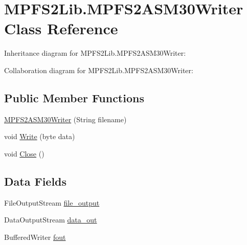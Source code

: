 \hypertarget{class_microchip_m_p_f_s_1_1_m_p_f_s2_lib_1_1_m_p_f_s2_a_s_m30_writer}{}\section{M\+P\+F\+S2\+Lib.\+M\+P\+F\+S2\+A\+S\+M30\+Writer Class Reference}
\label{class_microchip_m_p_f_s_1_1_m_p_f_s2_lib_1_1_m_p_f_s2_a_s_m30_writer}


Inheritance diagram for M\+P\+F\+S2\+Lib.\+M\+P\+F\+S2\+A\+S\+M30\+Writer\+:


Collaboration diagram for M\+P\+F\+S2\+Lib.\+M\+P\+F\+S2\+A\+S\+M30\+Writer\+:
\subsection*{Public Member Functions}
\begin{DoxyCompactItemize}
\item 
\hyperlink{class_microchip_m_p_f_s_1_1_m_p_f_s2_lib_1_1_m_p_f_s2_a_s_m30_writer_a801d66c9da87bcf8d7eb0ed6b02407fa}{M\+P\+F\+S2\+A\+S\+M30\+Writer} (String filename)
\item 
void \hyperlink{class_microchip_m_p_f_s_1_1_m_p_f_s2_lib_1_1_m_p_f_s2_a_s_m30_writer_a9b9d2585120ffb9ce8a6e4f644ee9df7}{Write} (byte data)
\item 
void \hyperlink{class_microchip_m_p_f_s_1_1_m_p_f_s2_lib_1_1_m_p_f_s2_a_s_m30_writer_a7f7a3199c392465d0767c6506c1af5b4}{Close} ()
\end{DoxyCompactItemize}
\subsection*{Data Fields}
\begin{DoxyCompactItemize}
\item 
File\+Output\+Stream \hyperlink{class_microchip_m_p_f_s_1_1_m_p_f_s2_lib_1_1_m_p_f_s2_a_s_m30_writer_ab03cefa914341b065e79a003ebc36ba5}{file\+\_\+output}
\item 
Data\+Output\+Stream \hyperlink{class_microchip_m_p_f_s_1_1_m_p_f_s2_lib_1_1_m_p_f_s2_a_s_m30_writer_aa84dd7c55e2064a5c35cd88bc52176e3}{data\+\_\+out}
\item 
Buffered\+Writer \hyperlink{class_microchip_m_p_f_s_1_1_m_p_f_s2_lib_1_1_m_p_f_s2_a_s_m30_writer_aac232ca8514f156a01d70fd44afdd7c1}{fout}
\end{DoxyCompactItemize}


